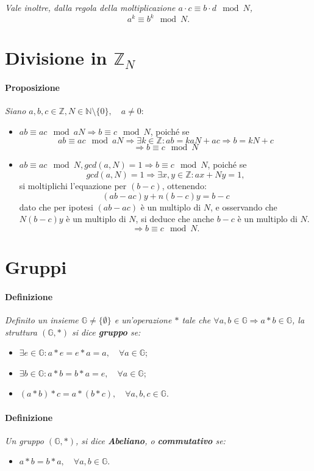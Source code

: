 \documentclass[a4paper]{report}
\begin{document}
\textit{Vale inoltre, dalla regola della moltiplicazione $a\cdot c\equiv b\cdot d \mod{N}$,}
$$a^k\equiv b^k \mod{N}.$$
\section{Divisione in $\mathbb{Z}_N$}
\paragraph{Proposizione} 
\textit{Siano $a,b,c\in \mathbb{Z}, N\in \mathbb{N}\setminus \{ 0\},\quad a\neq 0 $}:
\begin{itemize}
\item $ab\equiv ac \mod{aN} \Rightarrow b\equiv c\mod{N}$, poiché se
$$ab\equiv ac \mod{aN} \Rightarrow \exists k\in \mathbb{Z}: ab=kaN+ac\Rightarrow b=kN+c$$
$$\Rightarrow b\equiv c \mod{N}$$
\item $ab\equiv ac \mod{N}, gcd(a,N)=1 \Rightarrow b\equiv c\mod{N}$, poiché se
$$gcd(a,N)=1 \Rightarrow \exists x,y\in \mathbb{Z}: ax+Ny=1,$$
si moltiplichi l'equazione per $(b-c)$, ottenendo:
$$(ab-ac)y+n(b-c)y=b-c$$
dato che per ipotesi $(ab-ac)$ è un multiplo di $N$, e osservando che $N(b-c)y$ è un multiplo di $N$, si deduce che anche $b-c$ è un multiplo di $N$.
$$\Rightarrow b\equiv c \mod{N}.$$
\end{itemize}
\section{Gruppi}
\paragraph{Definizione} \textit{Definito un insieme $\mathbb{G} \neq \{\emptyset\}$ e un'operazione $*$ tale che $\forall a,b \in \mathbb{G}\Rightarrow a*b\in \mathbb{G}$, la struttura $(\mathbb{G},*)$ si dice \textbf{gruppo} se:}
\begin{itemize}
\item $\exists e \in \mathbb{G}: a*e=e*a=a,\quad \forall a \in \mathbb{G}$;
\item $\exists b \in \mathbb{G}: a*b=b*a=e,\quad \forall a \in \mathbb{G}$;
\item $(a*b)*c = a*(b*c), \quad \forall a,b,c \in \mathbb{G}$.
\end{itemize}
\paragraph{Definizione} \textit{Un gruppo $(\mathbb{G},*)$, si dice \textbf{Abeliano}, o \textbf{commutativo} se:}
\begin{itemize}
\item $a*b=b*a, \quad \forall a,b\in \mathbb{G}$. 
\end{itemize}
\end{document}
